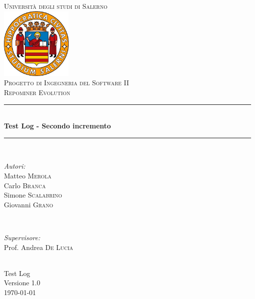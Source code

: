 \documentclass[a4paper, 12pt, italian]{report}
\begin{document}
\begin{titlepage}
\newcommand{\HRule}{\rule{\linewidth}{0.5mm}} 
\center 
\textsc{\LARGE Università degli studi di Salerno}\\[1cm] 
\includegraphics[width=3.5cm]{img/logo.jpg} \\[1cm]
\textsc{\large Progetto di Ingegneria del Software II}\\[0.5cm]
\textsc{\Large Repominer Evolution}\\[0.5cm] 
 \HRule \\[0.4cm]
{ \large \bfseries Test Log - Secondo incremento}\\[0.4cm] 
\HRule \\[1.5cm]

\begin{minipage}{0.4\textwidth}
\begin{flushleft} \large
\emph{Autori:}\\
Matteo \textsc{Merola}\\
Carlo \textsc{Branca}\\
Simone \textsc{Scalabrino}\\
Giovanni \textsc{Grano}\\
\end{flushleft}
\end{minipage}
~
\begin{minipage}{0.4\textwidth}
\begin{flushright} \large
\emph{Supervisore:} \\
Prof. Andrea \textsc{De Lucia}
\end{flushright}
\end{minipage}\\[2.5cm]

{\Large Test Log}\\
Versione 1.0\\[1cm]

{\large \today} %

\vfill

\end{titlepage}		
    
	\setcounter{tocdepth}{1}	
	\tableofcontents
	
	
	
	
	
\end{document}
